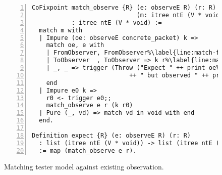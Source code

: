 \begin{figure}
\begin{lstlisting}[numbers=left]
CoFixpoint match_observe {R} (e: observeE R) (r: R)
                             (m: itree ntE (V * void))
           : itree ntE (V * void) :=
  match m with
  | Impure (oe: observeE concrete_packet) k =>
    match oe, e with
    | FromObserver, FromObserver%\label{line:match-from}%
    | ToObserver  , ToObserver => k r%\label{line:match-to}%
    | _, _ => trigger (Throw ("Expect " ++ print oe%\label{line:match-throw}%
                           ++ " but observed " ++ print e))
    end
  | Impure e0 k =>
    r0 <- trigger e0;;
    match_observe e r (k r0)
  | Pure (_, vd) => match vd in void with end
  end.

Definition expect {R} (e: observeE R) (r: R)
  : list (itree ntE (V * void)) -> list (itree ntE (V * void))
  := map (match_observe e r).
\end{lstlisting}
\caption{Matching tester model against existing observation.}
\label{fig:match-observe}
\end{figure}

